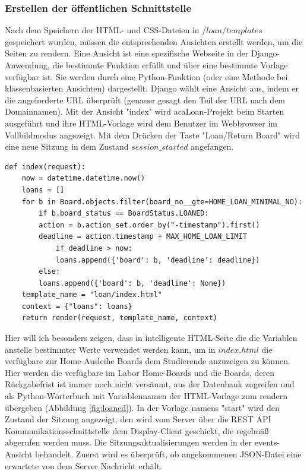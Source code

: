 \subsubsection{Erstellen der öffentlichen Schnittstelle}
\label{sec:server:design:views}
Nach dem Speichern der HTML- und CSS-Dateien in $/loan/templates$ gespeichert wurden, müssen  die entsprechenden Ansichten erstellt werden, um die Seiten zu rendern. Eine Ansicht ist eine spezifische Webseite in der Django-Anwendung, die bestimmte Funktion erfüllt und über eine bestimmte Vorlage verfügbar ist\cite{website:166:temp}. Sie werden durch eine Python-Funktion (oder eine Methode bei klassenbasierten Ansichten) dargestellt. Django wählt eine Ansicht aus, indem er die angeforderte URL überprüft (genauer gesagt den Teil der URL nach dem Domainnamen)\cite{website:166:temp}. Mit der Ansicht "index" wird acaLoan-Projekt beim Starten ausgeführt und ihre HTML-Vorlage wird dem Benutzer im Webbrowser im Vollbildmodus angezeigt. Mit dem Drücken der Taste "Loan/Return Board" wird eine neue Sitzung in dem Zustand $session\_started$ angefangen. 
\begin{lstlisting}[caption={Index-Ansicht in Django},captionpos=b]
def index(request):
	now = datetime.datetime.now()
	loans = []
	for b in Board.objects.filter(board_no__gte=HOME_LOAN_MINIMAL_NO):	
		if b.board_status == BoardStatus.LOANED:
		action = b.action_set.order_by("-timestamp").first()
		deadline = action.timestamp + MAX_HOME_LOAN_LIMIT	
			if deadline > now:
			loans.append({'board': b, 'deadline': deadline})
		else:
		loans.append({'board': b, 'deadline': None})	
	template_name = "loan/index.html"
	context = {"loans": loans}
	return render(request, template_name, context)
\end{lstlisting}
Hier will ich besonders zeigen, dass in intelligente HTML-Seite die die Variablen anstelle bestimmter Werte verwendet werden kann, um in $index.html$ die verfügbare zur Home-Ausleihe Boards dem Studierende anzuzeigen zu können. Hier werden die verfügbare im Labor Home-Boards und die Boards, deren Rückgabefrist ist immer noch nicht versäumt, aus der Datenbank zugreifen und als Python-Wörterbuch mit Variablennamen der HTML-Vorlage zum rendern übergeben (Abbildung \ref{fig:loaned}). In der Vorlage namens "start" wird den Zustand der Sitzung angezeigt, den wird vom Server über die REST API Kommunikationsschnittstelle dem Display-Client geschickt, die regelmäß abgerufen werden muss. Die Sitzungsaktualisierungen werden in der events-Ansicht behandelt. Zuerst wird es überprüft, ob angekommenen JSON-Datei eine erwartete von dem Server Nachricht erhält. 

